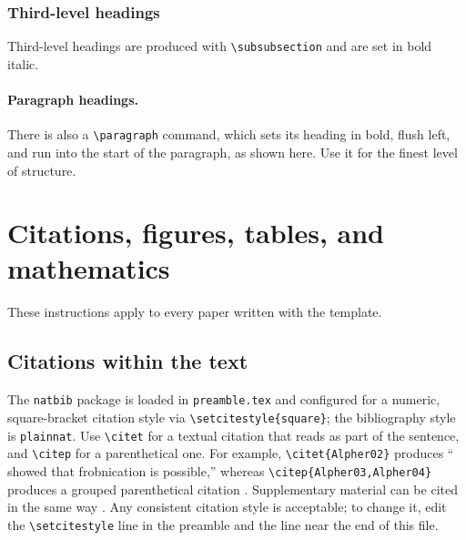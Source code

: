 \documentclass[11pt,letterpaper,twocolumn]{template/style}
\begin{document}
\subsubsection{Third-level headings}
\label{sec:third}

{\raggedright
Third-level headings are produced with \verb+\subsubsection+ and are set in bold
italic.
\par}

\paragraph{Paragraph headings.}
There is also a \verb+\paragraph+ command, which sets its heading in bold, flush
left, and run into the start of the paragraph, as shown here. Use it for the
finest level of structure.


\section{Citations, figures, tables, and mathematics}
\label{sec:others}

These instructions apply to every paper written with the template.

\subsection{Citations within the text}
\label{sec:citations}

The \verb+natbib+ package is loaded in \verb+preamble.tex+ and configured for a
numeric, square-bracket citation style via \verb+\setcitestyle{square}+; the
bibliography style is \verb+plainnat+. Use \verb+\citet+ for a textual citation
that reads as part of the sentence, and \verb+\citep+ for a parenthetical one.
For example, \verb+\citet{Alpher02}+ produces ``\citet{Alpher02} showed that
frobnication is possible,'' whereas \verb+\citep{Alpher03,Alpher04}+ produces a
grouped parenthetical citation \citep{Alpher03,Alpher04}. Supplementary material
can be cited in the same way \citep{Authors14}. Any consistent citation style is
acceptable; to change it, edit the \verb+\setcitestyle+ line in the preamble and
the \verb++ line near the end of this file.
\end{document}
